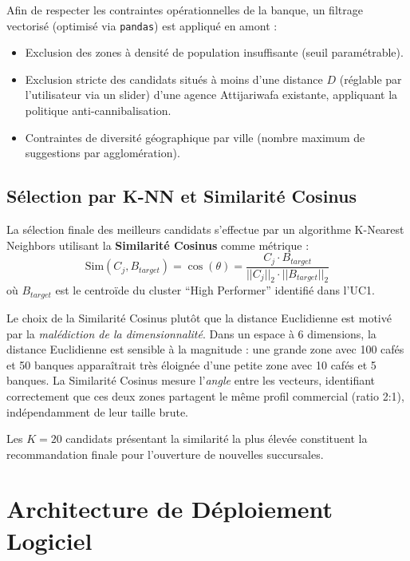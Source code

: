 Afin de respecter les contraintes opérationnelles de la banque, un filtrage vectorisé (optimisé via \texttt{pandas}) est appliqué en amont :
\begin{itemize}
    \item Exclusion des zones à densité de population insuffisante (seuil paramétrable).
    \item Exclusion stricte des candidats situés à moins d'une distance $D$ (réglable par l'utilisateur via un slider) d'une agence Attijariwafa existante, appliquant la politique anti-cannibalisation.
    \item Contraintes de diversité géographique par ville (nombre maximum de suggestions par agglomération).
\end{itemize}

\subsection{Sélection par K-NN et Similarité Cosinus}

La sélection finale des meilleurs candidats s'effectue par un algorithme K-Nearest Neighbors utilisant la \textbf{Similarité Cosinus} comme métrique :
\begin{equation}
\text{Sim}(C_j, B_{target}) = \cos(\theta) = \frac{C_j \cdot B_{target}}{||C_j||_2 \cdot ||B_{target}||_2}
\end{equation}
où $B_{target}$ est le centroïde du cluster ``High Performer'' identifié dans l'UC1.

Le choix de la Similarité Cosinus plutôt que la distance Euclidienne est motivé par la \textit{malédiction de la dimensionnalité}. Dans un espace à 6 dimensions, la distance Euclidienne est sensible à la magnitude : une grande zone avec 100 cafés et 50 banques apparaîtrait très éloignée d'une petite zone avec 10 cafés et 5 banques. La Similarité Cosinus mesure l'\textit{angle} entre les vecteurs, identifiant correctement que ces deux zones partagent le même profil commercial (ratio 2:1), indépendamment de leur taille brute.

Les $K=20$ candidats présentant la similarité la plus élevée constituent la recommandation finale pour l'ouverture de nouvelles succursales.

\section{Architecture de Déploiement Logiciel}

